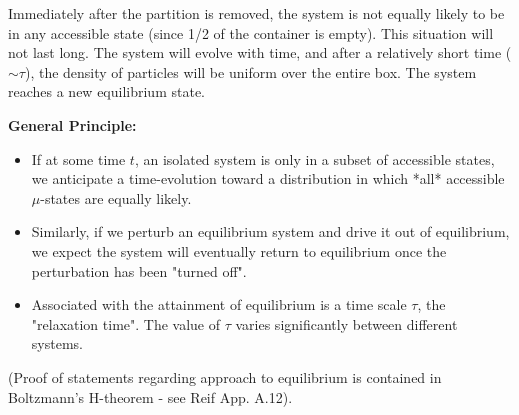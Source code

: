 \documentclass[11pt]{article}
\begin{document}
Immediately after the partition is removed, the system is not equally likely to be in any accessible state (since 1/2 of the container is empty). This situation will not last long. The system will evolve with time, and after a relatively short time ($\sim \tau$), the density of particles will be uniform over the entire box. The system reaches a new equilibrium state.

\textbf{General Principle:}
\begin{itemize}
    \item If at some time $t$, an isolated system is only in a subset of accessible states, we anticipate a time-evolution toward a distribution in which *all* accessible $\mu$-states are equally likely.
    \item Similarly, if we perturb an equilibrium system and drive it out of equilibrium, we expect the system will eventually return to equilibrium once the perturbation has been "turned off".
    \item Associated with the attainment of equilibrium is a time scale $\tau$, the "relaxation time". The value of $\tau$ varies significantly between different systems.
\end{itemize}
(Proof of statements regarding approach to equilibrium is contained in Boltzmann's H-theorem - see Reif App. A.12).
\end{document}
